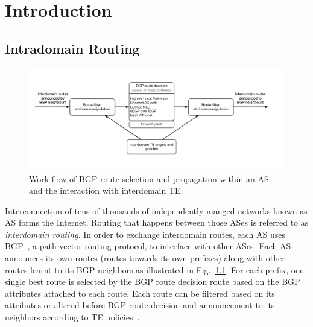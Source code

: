 \chapter{Introduction}
\label{sec:intro}

\section{Intradomain Routing}
\begin{figure}[!htb]
\centering
\includegraphics[width=1.3\textwidth]{gfx/chap1/bgp_decision.pdf}
\caption{Work flow of \ac{BGP} route selection and propagation within an \ac{AS} and the interaction with interdomain \ac{TE}.}
\label{fig:bgp_decision}
\end{figure}

Interconnection of tens of thousands of independently manged networks known as \ac{AS} forms the Internet.
Routing that happens between those ASes is referred to as 
\textit{interdomain routing}.
In order to exchange interdomain routes, each AS uses \ac{BGP}~\cite{bgp4}, a path vector routing protocol, to interface with other ASes.
Each AS announces its own routes (routes towards its own prefixes) along with other routes learnt to its BGP neighbors as illustrated in Fig.~\ref{fig:bgp_decision}.
For each prefix, one single best route is selected by the BGP route decision route based on the BGP attributes attached to each route.
Each route can be filtered based on its attributes or altered before BGP route decision and announcement to its neighbors according to \ac{TE} policies~\cite{Quoitin2003, Gao2001a}.


